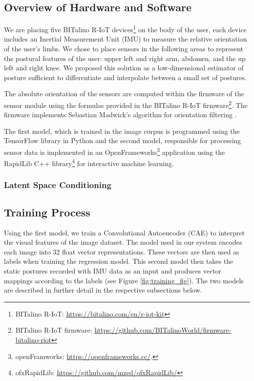 \subsection{Overview of Hardware and Software}

We are placing five BITalino R-IoT devices\footnote{BITalino R-IoT: \url{https://bitalino.com/en/r-iot-kit}} on the body of the user, each device includes an Inertial Measurement Unit (IMU) to measure the relative orientation of the user’s limbs. We chose to place sensors in the following areas to represent the postural features of the user: upper left and right arm, abdomen, and the up left and right knee. We proposed this solution as a low-dimensional estimator of posture sufficient to differentiate and interpolate between a small set of postures. 


The absolute orientation of the sensors are computed within the firmware of the sensor module using the formulas provided in the BITalino R-IoT firmware\footnote{BITalino R-IoT firmware: \url{https://github.com/BITalinoWorld/firmware-bitalino-riot}}. The firmware implements Sebastian Madwick’s algorithm for orientation filtering \cite{madgwick_ecient_nodate}. 

The first model, which is trained in the image corpus is programmed using the TensorFlow library \cite{abadi_tensorflow_2016} in Python and the second model, responsible for processing sensor data is implemented in an OpenFrameworks\footnote{openFramworks: \url{https://openframeworks.cc/}.} application using the RapidLib C++ library\footnote{ofxRapidLib: \url{https://github.com/mzed/ofxRapidLib/}} for interactive machine learning.

\subsubsection{Latent Space Conditioning}



\subsection{Training Process} 
\label{training_process}

Using the first model, we train a Convolutional Autoencoder (CAE) to interpret the visual features of the image dataset. The model used in our system encodes each image into 32 float vector representations. These vectors are then used as labels when training the regression model. This second model then takes the static postures recorded with IMU  data as an input and produces vector mappings according to the labels (see Figure \ref{fig:training_fig}). The two models are described in further detail in the respective subsections below.

